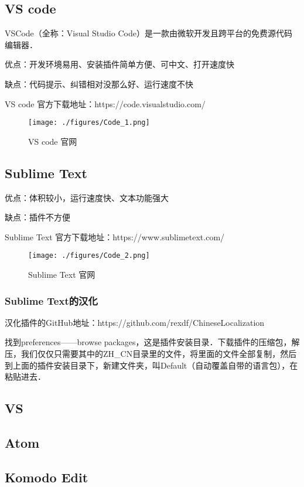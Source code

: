 
\subsection{VS code}

VSCode（全称：Visual Studio Code）是一款由微软开发且跨平台的免费源代码编辑器．

优点：开发环境易用、安装插件简单方便、可中文、打开速度快

缺点：代码提示、纠错相对没那么好、运行速度不快

VS code 官方下载地址：https://code.visualstudio.com/

\begin{figure}[ht]
\centering
\texttt{[image: ./figures/Code\_1.png]}
\caption{VS code 官网} \label{Code_fig1}
\end{figure}

\subsection{Sublime Text}

优点：体积较小，运行速度快、文本功能强大

缺点：插件不方便

Sublime Text 官方下载地址：https://www.sublimetext.com/

\begin{figure}[ht]
\centering
\texttt{[image: ./figures/Code\_2.png]}
\caption{Sublime Text 官网} \label{Code_fig2}
\end{figure}

\subsubsection{Sublime Text的汉化}

汉化插件的GitHub地址：https://github.com/rexdf/ChineseLocalization

找到preferences——browse packages，这是插件安装目录．下载插件的压缩包，解压，我们仅仅只需要其中的ZH_CN目录里的文件，将里面的文件全部复制，然后到上面的插件安装目录下，新建文件夹，叫Default（自动覆盖自带的语言包），在粘贴进去．

\subsection{VS}

\subsection{Atom}

\subsection{Komodo Edit}
